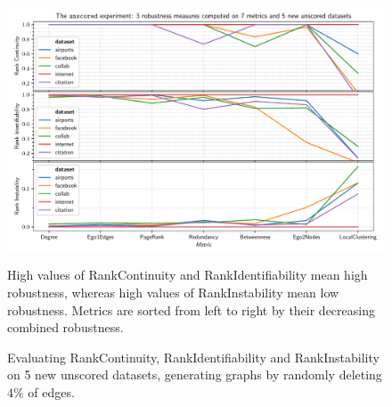 \begin{figure}
    \includegraphics[width=\linewidth]{plot_unscored.pdf}
    \vspace*{-0.6cm}
    \caption{Evaluating RankContinuity, RankIdentifiability and RankInstability on 5 new unscored datasets, generating graphs by randomly deleting $4\%$ of edges.}
    \label{fig:plot_unscored}
    \footnotesize\justify\vspace{-0.4\baselineskip}
    High values of RankContinuity and RankIdentifiability mean high robustness, whereas high values of RankInstability mean low robustness.
    Metrics are sorted from left to right by their decreasing combined robustness.
\end{figure}
